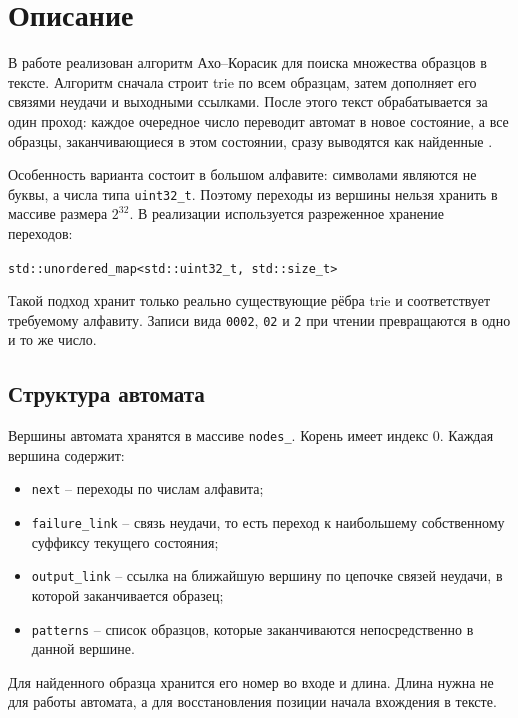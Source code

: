 \section{Описание}

В работе реализован алгоритм Ахо--Корасик для поиска множества образцов в тексте. Алгоритм сначала
строит trie по всем образцам, затем дополняет его связями неудачи и выходными ссылками. После этого
текст обрабатывается за один проход: каждое очередное число переводит автомат в новое состояние, а
все образцы, заканчивающиеся в этом состоянии, сразу выводятся как найденные \cite{AhoCorasick, Kormen3}.

Особенность варианта состоит в большом алфавите: символами являются не буквы, а числа типа
\texttt{uint32\_t}. Поэтому переходы из вершины нельзя хранить в массиве размера $2^{32}$.
В реализации используется разреженное хранение переходов:

\begin{center}
\texttt{std::unordered\_map<std::uint32\_t, std::size\_t>}
\end{center}

Такой подход хранит только реально существующие рёбра trie и соответствует требуемому алфавиту.
Записи вида \texttt{0002}, \texttt{02} и \texttt{2} при чтении превращаются в одно и то же число.

\subsection{Структура автомата}

Вершины автомата хранятся в массиве \texttt{nodes\_}. Корень имеет индекс \(0\). Каждая вершина содержит:
\begin{itemize}
\item \texttt{next} -- переходы по числам алфавита;
\item \texttt{failure\_link} -- связь неудачи, то есть переход к наибольшему собственному суффиксу текущего состояния;
\item \texttt{output\_link} -- ссылка на ближайшую вершину по цепочке связей неудачи, в которой заканчивается образец;
\item \texttt{patterns} -- список образцов, которые заканчиваются непосредственно в данной вершине.
\end{itemize}

Для найденного образца хранится его номер во входе и длина. Длина нужна не для работы автомата, а для
восстановления позиции начала вхождения в тексте.

